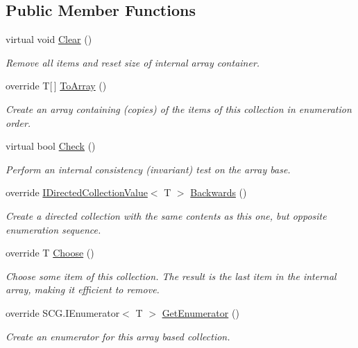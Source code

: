 \subsection*{Public Member Functions}
\begin{DoxyCompactItemize}
\item 
virtual void \hyperlink{class_c5_1_1_array_base_abfee2ce913abdf40245562982f40a496}{Clear} ()
\begin{DoxyCompactList}\small\item\em Remove all items and reset size of internal array container. \end{DoxyCompactList}\item 
override T\mbox{[}$\,$\mbox{]} \hyperlink{class_c5_1_1_array_base_a16ffcc583a32065194b3ea27d4a43cd4}{To\+Array} ()
\begin{DoxyCompactList}\small\item\em Create an array containing (copies) of the items of this collection in enumeration order. \end{DoxyCompactList}\item 
virtual bool \hyperlink{class_c5_1_1_array_base_a45363fe7b6709bba1e37094d2cd5bfdf}{Check} ()
\begin{DoxyCompactList}\small\item\em Perform an internal consistency (invariant) test on the array base. \end{DoxyCompactList}\item 
override \hyperlink{interface_c5_1_1_i_directed_collection_value}{I\+Directed\+Collection\+Value}$<$ T $>$ \hyperlink{class_c5_1_1_array_base_a11fbdc5f71bb41de404f3bd91e3a92b3}{Backwards} ()
\begin{DoxyCompactList}\small\item\em Create a directed collection with the same contents as this one, but opposite enumeration sequence. \end{DoxyCompactList}\item 
override T \hyperlink{class_c5_1_1_array_base_a1d5f2551ce0fb795a5f2105fcb958de8}{Choose} ()
\begin{DoxyCompactList}\small\item\em Choose some item of this collection. The result is the last item in the internal array, making it efficient to remove. \end{DoxyCompactList}\item 
override S\+C\+G.\+I\+Enumerator$<$ T $>$ \hyperlink{class_c5_1_1_array_base_a84a54c5fa039db32e27ca45c6b0cea85}{Get\+Enumerator} ()
\begin{DoxyCompactList}\small\item\em Create an enumerator for this array based collection. \end{DoxyCompactList}\end{DoxyCompactItemize}
